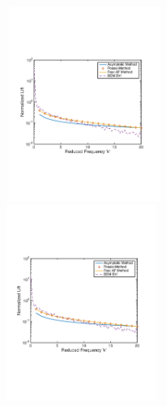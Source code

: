 \documentclass{article}
\begin{document}
\begin{figure}[h]
\centering
\begin{minipage}{0.5\textwidth}
	\centering
	\includegraphics[width = 3.5in, height = 2.5in]{NACA2401}
\end{minipage}%
\begin{minipage}{0.5\textwidth}
	\centering
	\includegraphics[width = 3.4in, height = 2.5in]{NACA1103}
\end{minipage}%
\end{figure}

\newpage 
\end{document}
